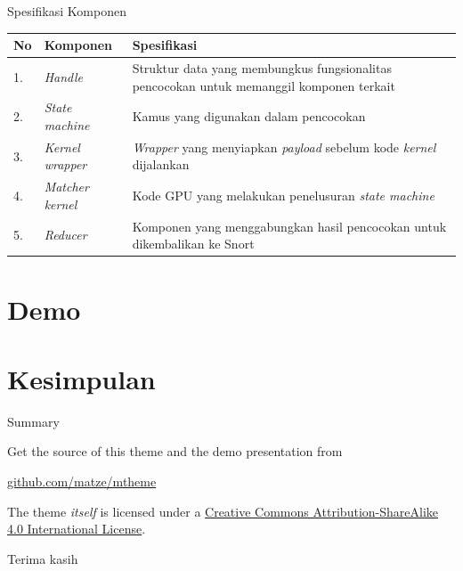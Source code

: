 \documentclass[10pt]{beamer}
\begin{document}
\begin{frame}{Spesifikasi Komponen}
    \begin{table}
    \begin{tabular}{@{} llp{7cm} @{}}
        \toprule
        No & Komponen & Spesifikasi\\
        \midrule
        1. & \emph{Handle} & Struktur data yang membungkus fungsionalitas pencocokan untuk memanggil komponen terkait\\
        2. & \emph{State machine} & Kamus yang digunakan dalam pencocokan\\
        3. & \emph{Kernel wrapper} & \emph{Wrapper} yang menyiapkan \emph{payload} sebelum kode \emph{kernel} dijalankan\\
        4. & \emph{Matcher kernel} & Kode GPU yang melakukan penelusuran \emph{state machine}\\
        5. & \emph{Reducer} & Komponen yang menggabungkan hasil pencocokan untuk dikembalikan ke Snort\\
        \bottomrule
    \end{tabular}
    \end{table}
\end{frame}

\section{Demo}

\section{Kesimpulan}

\begin{frame}{Summary}

    Get the source of this theme and the demo presentation from

    \begin{center}\url{github.com/matze/mtheme}\end{center}

    The theme \emph{itself} is licensed under a
    \href{http://creativecommons.org/licenses/by-sa/4.0/}{Creative Commons
    Attribution-ShareAlike 4.0 International License}.

    \begin{center}\ccbysa\end{center}

\end{frame}

\begin{frame}[standout]
    Terima kasih
\end{frame}
\end{document}
